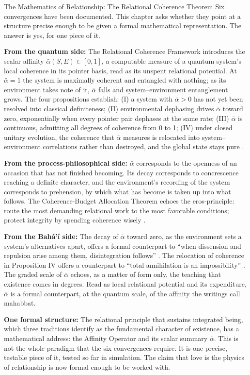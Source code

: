 \begin{convergencemoment}{The Mathematics of Relationship: The Relational Coherence Theorem}
Six convergences have been documented. This chapter asks whether they point at a structure precise enough to be given a formal mathematical representation. The answer is yes, for one piece of it.

\textbf{From the quantum side:} The Relational Coherence Framework introduces the scalar affinity $\bar{\alpha}(S,E) \in [0,1]$, a computable measure of a quantum system's local coherence in its pointer basis, read as its unspent relational potential. At $\bar{\alpha} = 1$ the system is maximally coherent and entangled with nothing; as its environment takes note of it, $\bar{\alpha}$ falls and system--environment entanglement grows. The four propositions establish: (I) a system with $\bar{\alpha} > 0$ has not yet been resolved into classical definiteness; (II) environmental dephasing drives $\bar{\alpha}$ toward zero, exponentially when every pointer pair dephases at the same rate; (III) $\bar{\alpha}$ is continuous, admitting all degrees of coherence from 0 to 1; (IV) under closed unitary evolution, the coherence that $\bar{\alpha}$ measures is relocated into system--environment correlations rather than destroyed, and the global state stays pure \citep{AdamsRCT}.

\textbf{From the process-philosophical side:} $\bar{\alpha}$ corresponds to the openness of an occasion that has not finished becoming. Its decay corresponds to concrescence reaching a definite character, and the environment's recording of the system corresponds to prehension, by which what has become is taken up into what follows. The Coherence-Budget Allocation Theorem echoes the eros-principle: route the most demanding relational work to the most favorable conditions; protect integrity by spending coherence wisely \citep{Whitehead1929}.

\textbf{From the Bahá'í side:} The decay of $\bar{\alpha}$ toward zero, as the environment sets a system's alternatives apart, offers a formal counterpart to ``when dissension and repulsion arise among them, disintegration follows'' \citep[Talk 41]{PUP}. The relocation of coherence in Proposition IV offers a counterpart to ``total annihilation is an impossibility'' \citep[Talk 38]{PUP}. The graded scale of $\bar{\alpha}$ echoes, as a matter of form only, the teaching that existence comes in degrees. Read as local relational potential and its expenditure, $\bar{\alpha}$ is a formal counterpart, at the quantum scale, of the affinity the writings call mahabbat.

\textbf{One formal structure:} The relational principle that sustains integrated being, which three traditions identify as the fundamental character of existence, has a mathematical address: the Affinity Operator and its scalar summary $\bar{\alpha}$. This is not the whole paradigm that the six convergences require. It is one precise, testable piece of it, tested so far in simulation. The claim that love is the physics of relationship is now formal enough to be worked with.
\end{convergencemoment}
